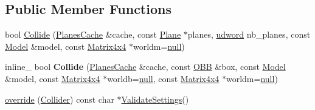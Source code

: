 \subsection*{Public Member Functions}
\begin{DoxyCompactItemize}
\item 
bool \hyperlink{classPlanesCollider_aa5a7c2fb04b8842f5df317dfc3c15df6}{Collide} (\hyperlink{structPlanesCache}{Planes\+Cache} \&cache, const \hyperlink{classPlane}{Plane} $\ast$planes, \hyperlink{IceTypes_8h_a44c6f1920ba5551225fb534f9d1a1733}{udword} nb\+\_\+planes, const \hyperlink{classModel}{Model} \&model, const \hyperlink{classMatrix4x4}{Matrix4x4} $\ast$worldm=\hyperlink{IceTypes_8h_ac97b8ee753e4405397a42ad5799b0f9e}{null})
\item 
inline\+\_\+ bool {\bfseries Collide} (\hyperlink{structPlanesCache}{Planes\+Cache} \&cache, const \hyperlink{classOBB}{O\+BB} \&box, const \hyperlink{classModel}{Model} \&model, const \hyperlink{classMatrix4x4}{Matrix4x4} $\ast$worldb=\hyperlink{IceTypes_8h_ac97b8ee753e4405397a42ad5799b0f9e}{null}, const \hyperlink{classMatrix4x4}{Matrix4x4} $\ast$worldm=\hyperlink{IceTypes_8h_ac97b8ee753e4405397a42ad5799b0f9e}{null})\hypertarget{classPlanesCollider_ae87b837a86f69b493a507333ed2f81dc}{}\label{classPlanesCollider_ae87b837a86f69b493a507333ed2f81dc}

\item 
\hyperlink{classPlanesCollider_a1d94337aeabee2429274f5c333d08dfa}{override} (\hyperlink{classCollider}{Collider}) const char $\ast$\hyperlink{classCollider_a225d4861b2184336433894174c6e3e2d}{Validate\+Settings}()
\end{DoxyCompactItemize}
